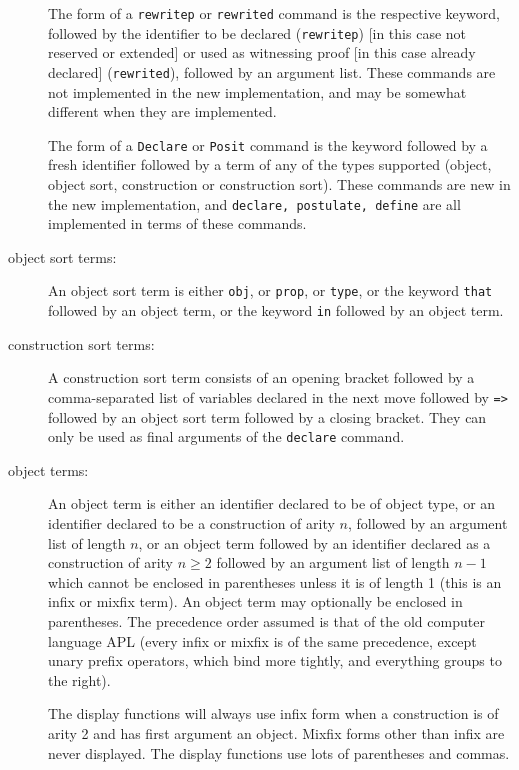 \documentclass[12pt]{article}
\begin{document}
\begin{description}
The form of a {\tt rewritep} or {\tt rewrited} command is the respective keyword, followed by the identifier to be declared ({\tt rewritep}) [in this case not reserved or extended]  or used as witnessing proof [in this case already declared] ({\tt rewrited}), followed by an argument list.  These commands are not implemented in the new implementation, and may be somewhat different when they are implemented.

The form of a {\tt Declare} or {\tt Posit} command is the keyword followed by a fresh identifier followed by a term of any of the types supported (object, object sort, construction or construction sort).  These commands are new in the new implementation, and {\tt declare, postulate, define} are all implemented in terms of these commands.

\item[object sort terms:]  An object sort term is either {\tt obj}, or {\tt prop}, or {\tt type}, or the keyword {\tt that} followed by an object term, or the keyword {\tt in} followed by an object term.

\item[construction sort terms:]  A  construction sort term consists of an opening bracket followed by a comma-separated list of variables declared in the next move followed by {\tt =>} followed by an object sort term followed by a closing bracket.  They can only be used as final arguments of the {\tt declare} command.

\item[object terms:]  An object term is either an identifier declared to be of object type, or an identifier declared to be a construction of arity $n$, followed by an argument list of length $n$,
or an object term followed by an identifier declared as a construction of arity $n \geq 2$  followed by an argument list of length $n-1$ which cannot be enclosed in parentheses unless it is of length 1
(this is an infix or mixfix term).  An object term may optionally be enclosed in parentheses.  The precedence order assumed is that of the old computer language APL (every infix or mixfix is of the same precedence, except unary prefix operators, which bind more tightly, and everything groups to the right).

The display functions will always use infix form when a construction is of arity 2 and has first argument an object.  Mixfix forms other than infix are never displayed.   The display functions use lots of parentheses and commas.


\end{description}
\end{document}
